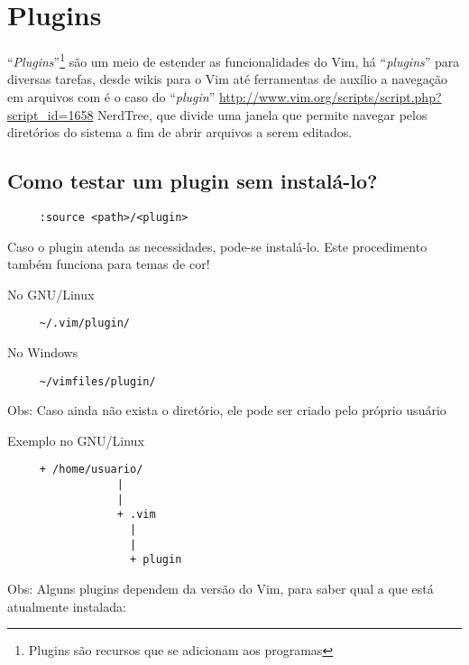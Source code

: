 
\chapter{Plugins}\label{Plugins}

``{\em Plugins}''\footnote{Plugins são recursos que se adicionam aos programas}
são um meio de estender as funcionalidades do Vim, há ``{\em plugins}'' para
diversas tarefas, desde wikis para o Vim até ferramentas de auxílio a navegação
em arquivos com é o caso do ``{\em plugin}''
\url{http://www.vim.org/scripts/script.php?script\_id=1658} NerdTree, que
divide uma janela que permite navegar pelos diretórios do sistema a fim de
abrir arquivos a serem editados.

\section{Como testar um plugin sem instalá-lo?}
\label{Como testar um plugin sem instala-lo?}

\begin{verbatim}
     :source <path>/<plugin>
\end{verbatim}

Caso o plugin atenda as necessidades, pode-se instalá-lo. Este
procedimento também funciona para temas de cor!


No GNU/Linux
\begin{verbatim}
     ~/.vim/plugin/
\end{verbatim}

No Windows

\begin{verbatim}
     ~/vimfiles/plugin/
\end{verbatim}

Obs: Caso ainda não exista o diretório, ele pode ser criado pelo próprio usuário

Exemplo no GNU/Linux

\begin{verbatim}
     + /home/usuario/
                 |
                 |
                 + .vim
                   |
                   |
                   + plugin
\end{verbatim}

Obs: Alguns plugins dependem da versão do Vim, para saber qual
a que está atualmente instalada:

